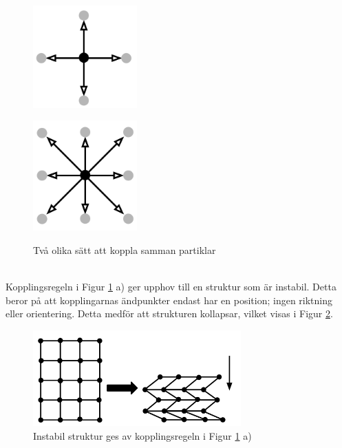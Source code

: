\documentclass[a4paper,12pt,oneside,final,swedish]{extarticle}
\begin{document}
\begin{figure}
  \begin{minipage}[h!]{.5\linewidth}
    \centering
    \includegraphics[width=4cm]{Bilder/2D_4Neighbors.png} 
    \label{fig:1a}
  \end{minipage}
  \begin{minipage}[h!]{.5\linewidth}
    \centering
    \includegraphics[width=4cm]{Bilder/2D_8Neighbors.png} 
    \label{fig:1b}
  \end{minipage}
  \caption{Två olika sätt att koppla samman partiklar}\label{2D_Neighbors}
\end{figure}

\noindent \\Kopplingsregeln i Figur \ref{2D_Neighbors} a) ger upphov till en struktur som är instabil. Detta beror på att kopplingarnas ändpunkter endast har en position; ingen riktning eller orientering. Detta medför att strukturen kollapsar, vilket visas i Figur \ref{2D_Instabil}.

\begin{figure}[h!]
  \begin{center}
    \includegraphics[width=8cm]{Bilder/2D_Instabil.png} 
  \end{center}
  \caption{Instabil struktur ges av kopplingsregeln i Figur \ref{2D_Neighbors} a) }
  \label{2D_Instabil}
\end{figure}
\end{document}
